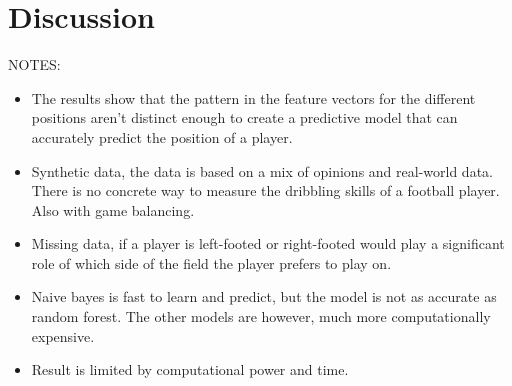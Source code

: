 \section{Discussion}

NOTES:
\begin{itemize}
    \item The results show that the pattern in the feature vectors for the different positions aren't distinct enough to create a predictive model that can accurately predict the position of a player.
    \item Synthetic data, the data is based on a mix of opinions and real-world data. There is no concrete way to measure the dribbling skills of a football player. Also with game balancing.
    \item Missing data, if a player is left-footed or right-footed would play a significant role of which side of the field the player prefers to play on.
    \item Naive bayes is fast to learn and predict, but the model is not as accurate as random forest. The other models are however, much more computationally expensive. 
    \item Result is limited by computational power and time.
\end{itemize}